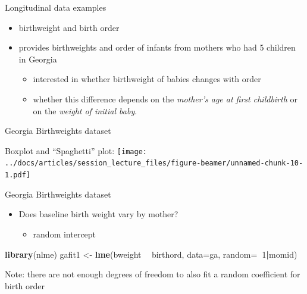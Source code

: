 \documentclass[
  ignorenonframetext,
]{beamer}
\newenvironment{Shaded}{\begin{snugshade}}{\end{snugshade}}
\newcommand{\DataTypeTok}[1]{\textcolor[rgb]{0.13,0.29,0.53}{#1}}
\newcommand{\DecValTok}[1]{\textcolor[rgb]{0.00,0.00,0.81}{#1}}
\newcommand{\KeywordTok}[1]{\textcolor[rgb]{0.13,0.29,0.53}{\textbf{#1}}}
\newcommand{\NormalTok}[1]{#1}
\newcommand{\OperatorTok}[1]{\textcolor[rgb]{0.81,0.36,0.00}{\textbf{#1}}}
\newcommand{\StringTok}[1]{\textcolor[rgb]{0.31,0.60,0.02}{#1}}
\providecommand{\tightlist}{%
  \setlength{\itemsep}{0pt}\setlength{\parskip}{0pt}}
\begin{document}
\begin{frame}{Longitudinal data examples}
\protect\hypertarget{longitudinal-data-examples-1}{}

\begin{itemize}
\tightlist
\item
  birthweight and birth order
\item
  provides birthweights and order of infants from mothers who had 5
  children in Georgia

  \begin{itemize}
  \tightlist
  \item
    interested in whether birthweight of babies changes with order
  \item
    whether this difference depends on the \emph{mother's age at first
    childbirth} or on the \emph{weight of initial baby}.
  \end{itemize}
\end{itemize}

\end{frame}

\begin{frame}{Georgia Birthweights dataset}
\protect\hypertarget{georgia-birthweights-dataset}{}

Boxplot and ``Spaghetti'' plot:
\texttt{[image: ../docs/articles/session\_lecture\_files/figure-beamer/unnamed-chunk-10-1.pdf]}

\end{frame}

\begin{frame}[fragile]{Georgia Birthweights dataset}
\protect\hypertarget{georgia-birthweights-dataset-1}{}

\begin{itemize}
\tightlist
\item
  Does baseline birth weight vary by mother?

  \begin{itemize}
  \tightlist
  \item
    random intercept
  \end{itemize}
\end{itemize}

\begin{Shaded}
\begin{Highlighting}[]
\KeywordTok{library}\NormalTok{(nlme)}
\NormalTok{gafit1 <-}\StringTok{ }\KeywordTok{lme}\NormalTok{(bweight }\OperatorTok{~}\StringTok{ }\NormalTok{birthord, }\DataTypeTok{data=}\NormalTok{ga, }
              \DataTypeTok{random=}\OperatorTok{~}\DecValTok{1}\OperatorTok{|}\NormalTok{momid)}
\end{Highlighting}
\end{Shaded}

Note: there are not enough degrees of freedom to also fit a random
coefficient for birth order

\end{frame}
\end{document}
